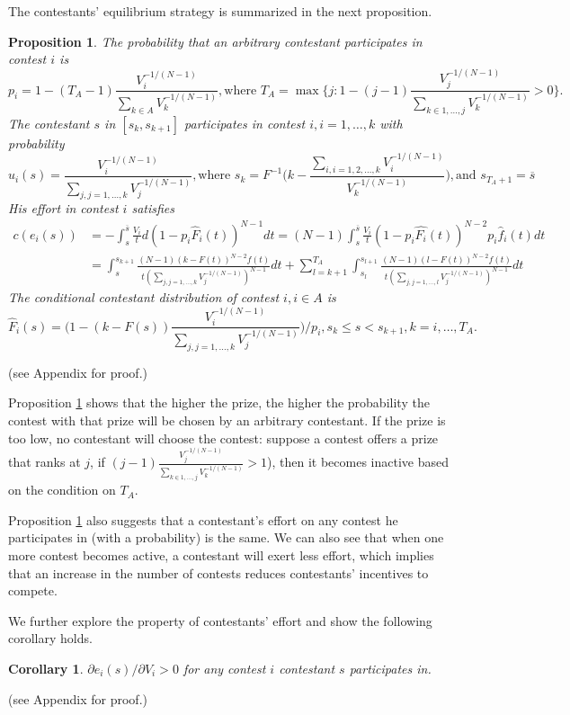 \documentclass[12pt]{article}
\newtheorem{corollary}{Corollary}
\newtheorem{Proposition}{Proposition}
\begin{document}
The contestants' equilibrium strategy is summarized in the next proposition.

\begin{Proposition}\label{fk} The probability that an arbitrary contestant
participates in contest $i$ is
\[
p_{i}=1-(T_{A}-1)\frac{V_{i}^{-1/(N-1)}}{\sum_{k\in A}V_{k}^{-1/(N-1)}},\text{where }T_{A}=\max\{j:1-(j-1)\frac{V_{j}^{-1/(N-1)}}{\sum_{k\in{1,\dots,j}}V_{k}^{-1/(N-1)}}>0\}.
\]
The contestant $s$ in $[s_{k},s_{k+1}]$ participates in contest
$i,{i=1,\dots,k}$ with probability
\[
u_{i}(s)=\frac{V_{i}^{-1/(N-1)}}{\sum_{j,j=1,\dots,k}V_{j}^{-1/(N-1)}},\text{where }s_{k}=F^{-1}\Big(k-\frac{\sum_{i,i=1,2,\dots,k}V_{i}^{-1/(N-1)}}{V_{k}^{-1/(N-1)}}\Big),\text{and }s_{T_{A}+1}=\overline{s}
\]
His effort in contest $i$ satisfies
\begin{align*}
c(e_{i}(s)) & =-\int_{s}^{\overline{s}}\frac{V_{i}}{t}d(1-p_{i}\hat{F}_{i}(t))^{N-1}dt=(N-1)\int_{s}^{\overline{s}}\frac{V_{i}}{t}(1-p_{i}\hat{F_{i}}(t))^{N-2}p_{i}\hat{f}_{i}(t)dt\\
 & =\int_{s}^{s_{k+1}}\frac{(N-1)(k-F(t))^{N-2}f(t)}{t(\sum_{j,j=1,\dots,k}V_{j}^{-1/(N-1)})^{N-1}}dt+\sum_{l=k+1}^{T_{A}}\int_{s_{l}}^{s_{l+1}}\frac{(N-1)(l-F(t))^{N-2}f(t)}{t(\sum_{j,j=1,\dots,l}V_{j}^{-1/(N-1)})^{N-1}}dt
\end{align*}
The conditional contestant distribution of contest $i,i\in A$ is
\[
\hat{F}_{i}(s)=\Big(1-(k-F(s))\frac{V_{i}^{-1/(N-1)}}{\sum_{j,j=1,\dots,k}V_{j}^{-1/(N-1)}}\Big)/p_{i},s_{k}\leq s<s_{k+1},k=i,\dots,T_{A}.
\]
\end{Proposition}

(see Appendix for proof.)

Proposition \ref{fk} shows that the higher the prize, the higher the probability
the contest with that prize will be chosen by an arbitrary contestant.
If the prize is too low, no contestant will choose the contest: suppose a contest offers a prize that ranks at $j$, if $(j-1)\frac{V_{j}^{-1/(N-1)}}{\sum_{k\in{1,\dots,j}}V_{k}^{-1/(N-1)}}>1$), then it becomes inactive based on the condition on $T_A$.

Proposition \ref{fk} also suggests that a contestant's effort on any contest he participates in (with a probability) is the same.  We can also see that when one more contest becomes active, a contestant will
exert less effort, which implies that an increase in the number of contests
reduces contestants' incentives to compete.

We further explore the property of contestants' effort and show the following corollary holds.
\begin{corollary}\label{cor_increasing}
$\partial e_{i}(s)/\partial V_{i}>0$ for any contest $i$ contestant
$s$ participates in. \end{corollary}  (see Appendix for proof.)
\end{document}
